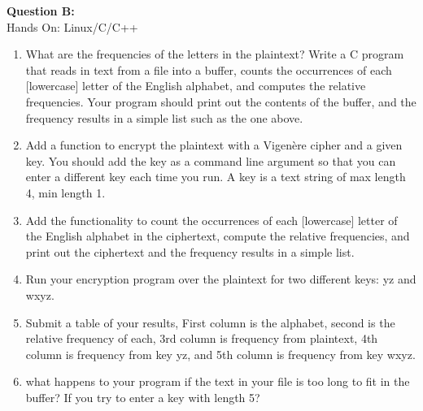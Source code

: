 \documentclass[a4paper, 11pt]{article}
\newenvironment{problem}[2][Question]
               { \begin{mdframed}[backgroundcolor=gray!20] \textbf{#1 #2:} \\}
               {   \end{mdframed}}
\begin{document}
 \begin{problem}{B} 
   Hands On: Linux/C/C++\\

   \begin{enumerate}[label=\arabic*.]
   \item
     What are the frequencies of the letters in the plaintext? Write a C program that reads in text from a file into a buffer, counts the occurrences of each [lowercase] letter of the English alphabet, and computes the relative frequencies. Your program should print out the contents of the buffer, and the frequency results in a simple list such as the one above.
   \item
     Add a function to encrypt the plaintext with a Vigenère cipher and a given key. You should add the key as a command line argument so that you can enter a different key each time you run. A key is a text string of max length 4, min length 1.
   \item
    Add the functionality to count the occurrences of each [lowercase] letter of the English alphabet in the ciphertext, compute the relative frequencies, and print out the ciphertext and the frequency results in a simple list.
  \item
    Run your encryption program over the plaintext for two different keys: yz and wxyz.
  \item
    Submit a table of your results, First column is the alphabet, second is the relative frequency of each, 3rd column is frequency from plaintext, 4th column is frequency from key yz, and 5th column is frequency from key wxyz.
  \item
    what happens to your program if the text in your file is too long to fit in the buffer? If you try to enter a key with length 5?
  \end{enumerate}
  
\end{problem}
\end{document}
